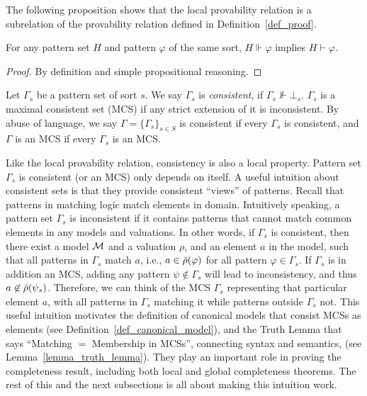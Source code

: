 \documentclass{amsart}
\begin{document}
The following proposition shows that the local provability relation is
a subrelation of the provability relation defined in Definition~\ref{def_proof}.
\begin{proposition}
For any pattern set $H$
and pattern $\varphi$ of the same sort,
$H \Vdash \varphi$ implies $H \vdash \varphi$.
\end{proposition}
\begin{proof}
By definition and simple propositional reasoning.
\end{proof}

\begin{definition}
\label{def_consistent_sets}
Let $\Gamma_s$ be a pattern set of sort $s$.
We say $\Gamma_s$ is \emph{consistent}, if $\Gamma_s \not\Vdash \bot_s$.
$\Gamma_s$ is a maximal consistent set (MCS) 
if any strict extension of it is inconsistent.
By abuse of language,
we say $\Gamma = \{ \Gamma_s \}_{s \in S}$ 
is consistent if every $\Gamma_s$ is consistent,
and $\Gamma$ is an MCS if every $\Gamma_s$ is an MCS.
\end{definition}

Like the local provability relation,
consistency is also a local property.
Pattern set $\Gamma_s$ is consistent (or an MCS) only depends on itself.
A useful intuition about consistent sets
is that they provide consistent ``views'' of patterns.
Recall that patterns in matching logic match elements in domain.
Intuitively speaking, a pattern set $\Gamma_s$ is inconsistent
if it contains patterns 
that cannot match common elements in any models and valuations.
In other words,
if $\Gamma_s$ is consistent,
then there exist a model $\mathcal{M}$ and a valuation $\rho$,
and an element $a$ in the model,
such that 
all patterns in $\Gamma_s$ match $a$,
i.e.,
$a \in \bar{\rho}(\varphi)$
for all pattern $\varphi \in \Gamma_s$.
If $\Gamma_s$ is in addition an MCS, 
adding any pattern $\psi \not\in \Gamma_s$ will lead to inconsistency, 
and thus $a \not\in \bar{\rho}(\psi_s)$.
Therefore, we can think of the MCS $\Gamma_s$ representing
that particular element $a$,
with all patterns in $\Gamma_s$ matching it
while patterns outside $\Gamma_s$ not.
This useful intuition motivates the definition of canonical models
that consist MCSs as elements (see Definition~\ref{def_canonical_model}),
and the Truth Lemma that says
``Matching $=$ Membership in MCSs'',
connecting syntax and semantics,
(see Lemma~\ref{lemma_truth_lemma}).
They play an important role in proving the completeness result,
including both local and global completeness theorems.
The rest of this and the next subsections is all about making this intuition work.
\end{document}
